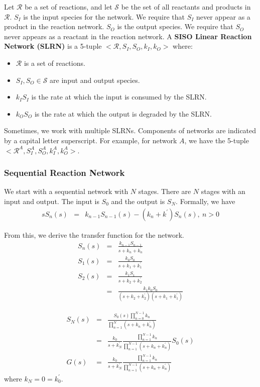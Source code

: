 \documentclass[unnumsec,webpdf,contemporary,large]{oup-authoring-template}%
\theoremstyle{thmstyleone}%
\theoremstyle{thmstyletwo}%
\theoremstyle{thmstylethree}%
\begin{document}
Let $\mathcal{R}$ be a set of reactions, and let
$\mathcal{S}$ be the set of all reactants and products in $\mathcal{R}$.
$S_I$ is the input species for the network.
We require that $S_I$ never appear as a product in the reaction network.
$S_O$ is the output species.
We require that $S_O$ never appears as a reactant in the reaction network.
A {\bf SISO Linear Reaction Network (SLRN)} is
a 5-tuple
$<\mathcal{R}, S_I, S_O, k_I, k_O>$ where:
\begin{itemize}
    \item $\mathcal{R}$ is a set of reactions.
    \item 
    $S_I, S_O \in \mathcal{S}$ are input and output species.
    \item $k_I S_I$ is the rate at which the input is consumed
    by the SLRN.
    \item $k_O S_O$ is the rate at which the output is degraded by the SLRN.
\end{itemize}
Sometimes, we work with multiple SLRNs. Components of networks are indicated by a
capital letter superscript.
For example, for network $A$, we have the 5-tuple
$<\mathcal{R}^A, S^A_I, S^A_O, k^A_I, k^A_O>$.

\subsubsection{Sequential Reaction Network}

We start with a sequential network with $N$ stages.
There are $N$ stages with an input and output. The input is $S_0$ and the output is $S_N$. Formally, we have
\begin{eqnarray}
s S_n (s) & =&  k_{n-1} S_{n-1} (s) - (k_n + k^{\prime}) S_n (s) ,~ n>0
\end{eqnarray}

From this, we derive the transfer function for the network.
\begin{align}
S_n (s) & = & \frac{k_{n-1} S_{n-1}}{s + k_n + k^{\prime}_n} \nonumber \\
S_1 (s) & = & \frac{k_0 S_0}{s + k_1 + k^{\prime}_1} \nonumber \\
S_2 (s) & = & \frac{k_1 S_1}{s + k_2 + k^{\prime}_2} \nonumber \\
  & = & \frac{k_1 k_0 S_0}{(s + k_2 + k^{\prime}_2)(s + k_1 + k^{\prime}_1)}
\end{align}

\begin{eqnarray}
S_N (s) & = & \frac{S_0 (s) \prod_{n=0}^{N-1} k_n }{\prod_{n=1}^N(s + k_n + k^{\prime}_n)} \nonumber \\
    & = &  \frac{ k_0 }{s  +  k^{\prime}_N}  
    \frac{\prod_{n=1}^{N-1} k_n }{\prod_{n=1}^{N-1}(s + k_n + k^{\prime}_n)} S_0(s) \nonumber \\
G (s) & = &  \frac{ k_0 }{s  +  k^{\prime}_N}  
    \frac{\prod_{n=1}^{N-1} k_n }{\prod_{n=1}^{N-1}(s + k_n + k^{\prime}_n)}
\end{eqnarray}
where $k_N = 0= k^{\prime}_0$.
\end{document}
